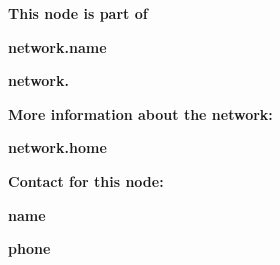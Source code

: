 \documentclass[a5paper,landscape]{article}
\begin{document}
\thispagestyle{empty}

\center

\vfill

\textcolor{ca3a3a3}{\large\bf This node is part of}

\vspace{1em}

\textcolor{c738c72}{\Huge\bf {{ network.name}} }

\vspace{1em}

\textcolor{ca3a3a3}{\large\bf network.}

\vfill

\textcolor{ca3a3a3}{\large\bf More information about the network:}

\vspace{1em}

\textcolor{c738c72}{\Huge\bf {{ network.home }}}

\vfill

\textcolor{ca3a3a3}{\Large\bf Contact for this node:}

\vspace{1em}

\textcolor{c738c72}{\Huge\bf {{ name }} }

\vspace{0.5em}

\textcolor{c738c72}{\Huge\bf {{ phone }} }

\vfill
\end{document}
